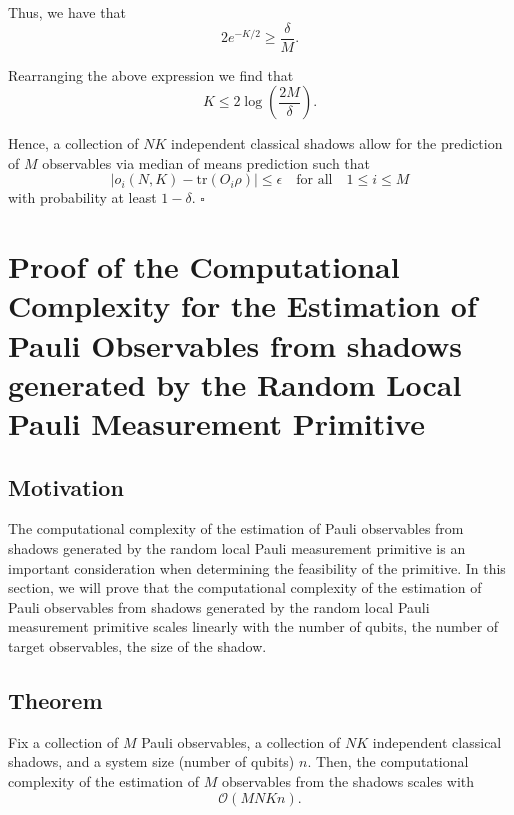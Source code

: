 \documentclass[12pt]{article}
\begin{document}
    Thus, we have that
    \begin{equation*}
        2e^{-K/2} \geq \frac{\delta}{M}.
    \end{equation*}

    Rearranging the above expression we find that
    \begin{equation*}
        K \leq 2\log{\left(\frac{2M}{\delta}\right)}.
    \end{equation*}

    Hence, a collection of $NK$ independent classical shadows allow for the prediction of $M$ observables via median of means prediction such that
    \begin{equation*}
        |\hat{o}_i(N,K) - \text{tr}(O_i\rho)| \leq \epsilon \quad \text{for all} \quad 1 \leq i \leq M
    \end{equation*}
    with probability at least $1-\delta$.
    \hfill $\square$

    \section{Proof of the Computational Complexity for the Estimation of Pauli Observables from shadows generated by the Random Local Pauli Measurement Primitive}
    \subsection{Motivation}
    The computational complexity of the estimation of Pauli observables from shadows generated by the random local Pauli measurement primitive is an important consideration when determining the feasibility of the primitive. In this section, we will prove that the computational complexity of the estimation of Pauli observables from shadows generated by the random local Pauli measurement primitive scales linearly with the number of qubits, the number of target observables, the size of the shadow.

    \subsection{Theorem}
    Fix a collection of $M$ Pauli observables, a collection of $NK$ independent classical shadows, and a system size (number of qubits) $n$. Then, the computational complexity of the estimation of $M$ observables from the shadows scales with
    \begin{equation*}
        \mathcal{O}\left(MNKn\right).
    \end{equation*}
\end{document}
